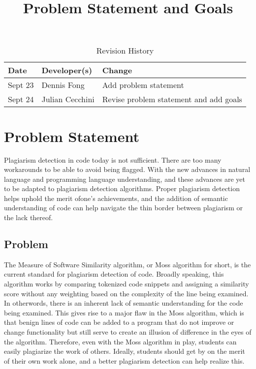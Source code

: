\documentclass{article}
\title{Problem Statement and Goals\\\progname}
\author{\authname}
\date{}
\begin{document}
\maketitle

\begin{table}[hp]
\caption{Revision History} \label{TblRevisionHistory}
\begin{tabularx}{\textwidth}{llX}
\toprule
\textbf{Date} & \textbf{Developer(s)} & \textbf{Change}\\
\midrule
Sept 23 & Dennis Fong & Add problem statement\\
Sept 24 & Julian Cecchini & Revise problem statement and add goals\\
\bottomrule
\end{tabularx}
\end{table}

\section{Problem Statement}

Plagiarism detection in code today is not sufficient. There are too many
workarounds to be able to avoid being flagged. With the new advances in natural
language and programming language understanding, and these advances are yet to 
be adapted to plagiarism detection algorithms. Proper plagiarism detection 
helps uphold the merit ofone's achievements, and the addition of semantic 
understanding of code can help navigate the thin border between plagiarism or 
the lack thereof. 


\subsection{Problem}
The Measure of Software Similarity algorithm, or Moss algorithm for short, is
the current standard for plagiarism detection of code. Broadly speaking, this
algorithm works by comparing tokenized code snippets and assigning a similarity
score without any weighting based on the complexity of the line being examined.
In otherwords, there is an inherent lack of semantic understanding for the code
being examined. This gives rise to a major flaw in the Moss algorithm, which is
that benign lines of code can be added to a program that do not improve or
change functionality but still serve to create an illusion of difference in the
eyes of the algorithm. Therefore, even with the Moss algorithm in play, students
can easily plagiarize the work of others. Ideally, students should get by on the
merit of their own work alone, and a better plagiarism detection can help
realize this.
\end{document}
